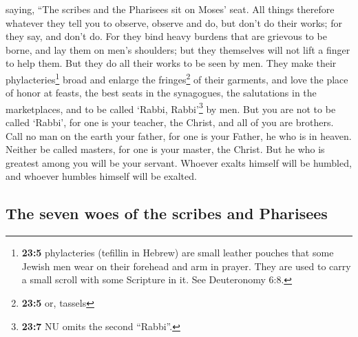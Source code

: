  saying, ``The scribes and the Pharisees sit on Moses'
seat.  All things therefore whatever they tell you to
observe, observe and do, but don't do their works; for they say, and
don't do.  For they bind heavy burdens that are grievous
to be borne, and lay them on men's shoulders; but they themselves will
not lift a finger to help them.  But they do all their
works to be seen by men. They make their phylacteries\footnote{\textbf{23:5}
  phylacteries (tefillin in Hebrew) are small leather pouches that some
  Jewish men wear on their forehead and arm in prayer. They are used to
  carry a small scroll with some Scripture in it. See Deuteronomy 6:8.}
broad and enlarge the fringes\footnote{\textbf{23:5} or, tassels} of
their garments,  and love the place of honor at feasts,
the best seats in the synagogues,  the salutations in the
marketplaces, and to be called `Rabbi, Rabbi'\footnote{\textbf{23:7} NU
  omits the second ``Rabbi''.} by men.  But you are not to
be called `Rabbi', for one is your teacher, the Christ, and all of you
are brothers.  Call no man on the earth your father, for
one is your Father, he who is in heaven.  Neither be
called masters, for one is your master, the Christ.  But
he who is greatest among you will be your servant. 
Whoever exalts himself will be humbled, and whoever humbles himself will
be exalted.

\hypertarget{the-seven-woes-of-the-scribes-and-pharisees}{%
\subsection{The seven woes of the scribes and
Pharisees}\label{the-seven-woes-of-the-scribes-and-pharisees}}

